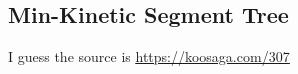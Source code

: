 \subsection{Min-Kinetic Segment Tree}
I guess the source is \underline{\url{https://koosaga.com/307}}
